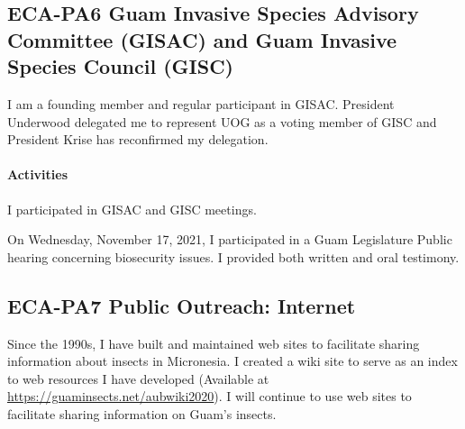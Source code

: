 \subsection{ECA-PA6 Guam Invasive Species Advisory Committee (GISAC) and Guam Invasive Species Council (GISC)}
	
I am a founding member and regular participant in GISAC. President Underwood delegated me to represent UOG as a voting member of GISC and President Krise has reconfirmed my delegation.

\paragraph{Activities}

I participated in GISAC and GISC meetings.

On Wednesday, November 17, 2021, I participated in a Guam Legislature Public hearing concerning biosecurity issues. I provided both written and oral testimony.
\begin{comment}
\paragraph{Plans for 15JUN2021-14JUN2022}

I plan to continue as an active member of GISAC and GISC.

I plan to participate in a review of the Guam Invasive Species Management Plan.

\paragraph{Plans for 15JUN2022-14JUN2023}

I plan to continue as an active member of GISAC and GISC.

I plan to participate in a review of the Guam Invasive Species Management Plan.
\end{comment}
\subsection{ECA-PA7 Public Outreach: Internet}

Since the 1990s, I have built and maintained web sites to facilitate sharing information about insects in Micronesia. I created a wiki site to serve as an index to web resources I have developed (Available at  \url{https://guaminsects.net/aubwiki2020}). I will continue to use web sites to facilitate sharing information on Guam's insects.
\begin{comment}
\paragraph{Plans for 15JUN2021-14JUN2022}
I will continue to create and maintain websites about insects in Micronesia.

\paragraph{Plans for 15JUN2022-14JUN2023}
I will continue to create and maintain websites about insects in Micronesia.
\end{comment}

